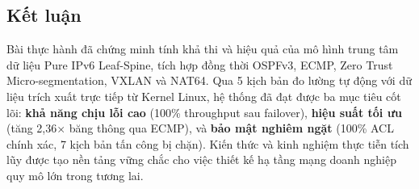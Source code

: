 \subsection{Kết luận}

Bài thực hành đã chứng minh tính khả thi và hiệu quả của mô hình trung tâm dữ liệu Pure IPv6 Leaf-Spine, tích hợp đồng thời OSPFv3, ECMP, Zero Trust Micro-segmentation, VXLAN và NAT64. Qua 5 kịch bản đo lường tự động với dữ liệu trích xuất trực tiếp từ Kernel Linux, hệ thống đã đạt được ba mục tiêu cốt lõi: \textbf{khả năng chịu lỗi cao} (100\% throughput sau failover), \textbf{hiệu suất tối ưu} (tăng 2,36$\times$ băng thông qua ECMP), và \textbf{bảo mật nghiêm ngặt} (100\% ACL chính xác, 7 kịch bản tấn công bị chặn). Kiến thức và kinh nghiệm thực tiễn tích lũy được tạo nền tảng vững chắc cho việc thiết kế hạ tầng mạng doanh nghiệp quy mô lớn trong tương lai.
